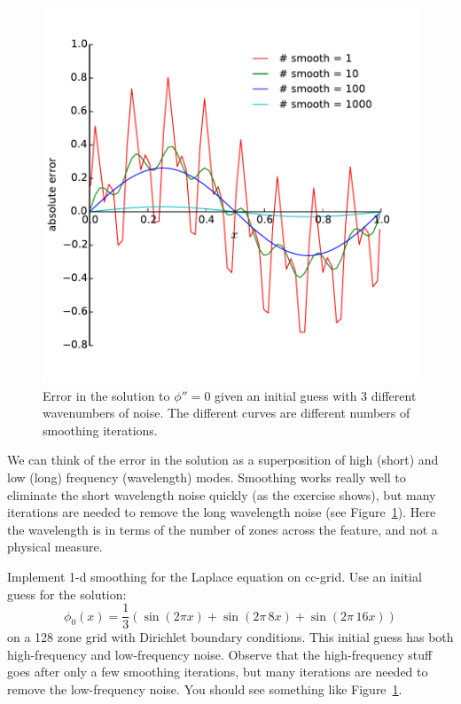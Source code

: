 \begin{figure}[t]
\centering
\includegraphics[width=0.8\linewidth]{smooth-multimode}
\caption[Smoothing of different wavenumbers]{\label{fig:smooth} Error
  in the solution to $\phi'' = 0$ given an initial guess with 3
  different wavenumbers of noise.  The different curves are different
  numbers of smoothing iterations. \\
  }
\end{figure}

We can think of the error in the solution as a superposition of high
(short) and low (long) frequency (wavelength) modes.  Smoothing works
really well to eliminate the short wavelength noise quickly (as the
exercise shows), but many iterations are needed to remove the long
wavelength noise (see Figure~\ref{fig:smooth}).  Here the wavelength
is in terms of the number of zones across the feature, and not a
physical measure.  

\begin{exercise}
{Implement 1-d smoothing for the Laplace equation on
  cc-grid.  Use an initial guess for the solution:
  \begin{equation}
  \phi_0(x) = \frac{1}{3} ( \sin(2\pi x) + \sin(2\pi \, 8 x) + \sin(2\pi \, 16 x) )
  \end{equation}
  on a 128 zone grid with Dirichlet boundary conditions.  This initial
  guess has both high-frequency and low-frequency noise.  Observe that
  the high-frequency stuff goes after only a few smoothing iterations,
  but many iterations are needed to remove the low-frequency noise.
  You should see something like Figure~\ref{fig:smooth}.
}
\end{exercise}

